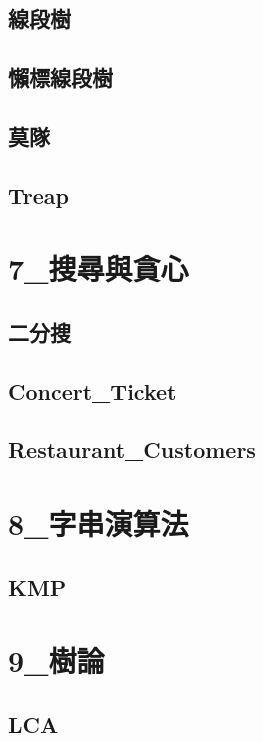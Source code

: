 \subsection{線段樹}

\subsection{懶標線段樹}

\subsection{莫隊}

\subsection{Treap}


\section{7_搜尋與貪心}
\subsection{二分搜} 

\subsection{Concert_Ticket}

\subsection{Restaurant_Customers}


\section{8_字串演算法}
\subsection{KMP} 


\section{9_樹論}
\subsection{LCA} 

